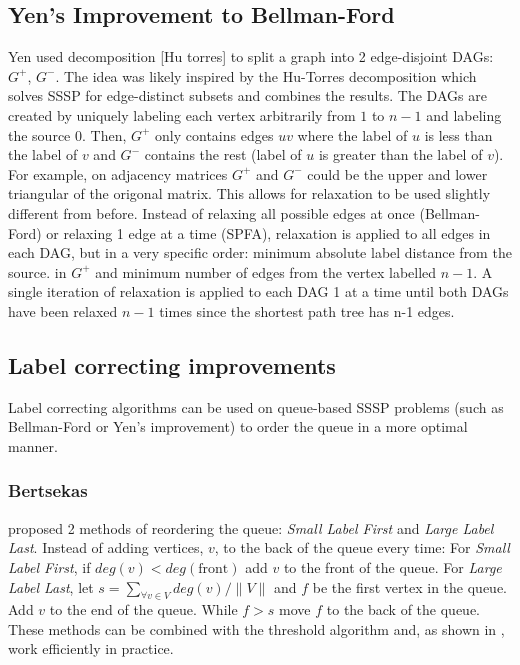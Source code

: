 \documentclass{article}
\begin{document}
\subsection{Yen's Improvement to Bellman-Ford}
Yen used decomposition [Hu torres] to split a graph into 2 edge-disjoint DAGs: $G^+$, $G^-$. The idea was likely inspired by the Hu-Torres decomposition which solves SSSP for edge-distinct subsets and combines the results. The DAGs are created by uniquely labeling each vertex arbitrarily from $1$ to $n-1$ and labeling the source $0$. Then, $G^+$ only contains edges $uv$ where the label of $u$ is less than the label of $v$ and $G^-$ contains the rest (label of $u$ is greater than the label of $v$). For example, on adjacency matrices $G^+$ and $G^-$ could be the upper and lower triangular of the origonal matrix. This allows for relaxation to be used slightly different from before.  Instead of relaxing all possible edges at once (Bellman-Ford) or relaxing 1 edge at a time (SPFA), relaxation is applied to all edges in each DAG, but in a very specific order: minimum absolute label distance from the source. in $G^+$ and minimum number of edges from the vertex labelled $n-1$. A single iteration of relaxation is applied to each DAG 1 at a time until both DAGs have been relaxed $n-1$ times since the shortest path tree has n-1 edges.
\subsection{Label correcting improvements}
Label correcting algorithms can be used on queue-based SSSP problems (such as Bellman-Ford or Yen's improvement) to order the queue in a more optimal manner.

\subsubsection{Bertsekas}
\cite{Bertsekas1, Bertsekas2} proposed 2 methods of reordering the queue: \textit{Small Label First} and \textit{Large Label Last}. Instead of adding vertices, $v$, to the back of the queue every time:
For \textit{Small Label First}, if $deg(v) < deg(\text{front})$ add $v$ to the front of the queue.
For \textit{Large Label Last}, let $s = \sum_{\forall v \in V}deg(v) /\|V\|$ and $f$ be the first vertex in the queue. Add $v$ to the end of the queue. While $f > s$ move $f$ to the back of the queue.\\
These methods can be combined with the threshold algorithm and, as shown in \cite{Bertsekas1}, work efficiently in practice.
\end{document}
